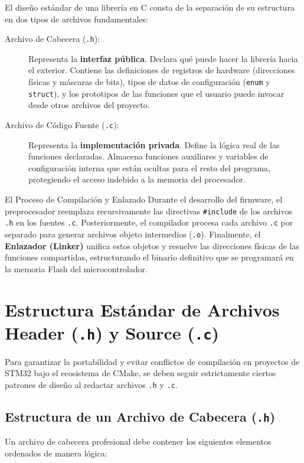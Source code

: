 \documentclass[
10pt, %
a4paper, %
oneside, %
headinclude,footinclude, %
BCOR5mm, %
]{scrartcl}
\begin{document}
El diseño estándar de una librería en C consta de la separación de su estructura en dos tipos de archivos fundamentales:
\begin{description}
	\item[Archivo de Cabecera (\texttt{.h}):] Representa la \textbf{interfaz pública}. Declara qué puede hacer la librería hacia el exterior. Contiene las definiciones de registros de hardware (direcciones físicas y máscaras de bits), tipos de datos de configuración (\texttt{enum} y \texttt{struct}), y los prototipos de las funciones que el usuario puede invocar desde otros archivos del proyecto.
	\item[Archivo de Código Fuente (\texttt{.c}):] Representa la \textbf{implementación privada}. Define la lógica real de las funciones declaradas. Almacena funciones auxiliares y variables de configuración interna que están ocultas para el resto del programa, protegiendo el acceso indebido a la memoria del procesador.
\end{description}

\begin{InfoBox}{El Proceso de Compilación y Enlazado}
	Durante el desarrollo del firmware, el preprocesador reemplaza recursivamente las directivas \texttt{\#include} de los archivos \texttt{.h} en los fuentes \texttt{.c}. Posteriormente, el compilador procesa cada archivo \texttt{.c} por separado para generar archivos objeto intermedios (\texttt{.o}). Finalmente, el \textbf{Enlazador (Linker)} unifica estos objetos y resuelve las direcciones físicas de las funciones compartidas, estructurando el binario definitivo que se programará en la memoria Flash del microcontrolador.
\end{InfoBox}

\newpage
\section{Estructura Estándar de Archivos Header (\texttt{.h}) y Source (\texttt{.c})}

Para garantizar la portabilidad y evitar conflictos de compilación en proyectos de STM32 bajo el ecosistema de CMake, se deben seguir estrictamente ciertos patrones de diseño al redactar archivos \texttt{.h} y \texttt{.c}.

\subsection{Estructura de un Archivo de Cabecera (\texttt{.h})}
Un archivo de cabecera profesional debe contener los siguientes elementos ordenados de manera lógica:
\end{document}
